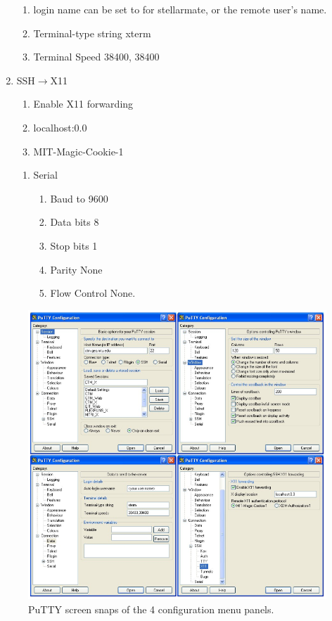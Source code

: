 \begin{enumerate}
\begin{enumerate}
   \item   login name can be set to  for stellarmate, or
     the remote user's name.
   \item   Terminal-type string xterm
   \item   Terminal Speed 38400, 38400
\end{enumerate}
   \item   SSH$\rightarrow$X11
\vspace{-.15cm}
\begin{enumerate}\addtolength{\itemsep}{-0.5\baselineskip}
   \item   Enable X11 forwarding
   \item   localhost:0.0
   \item   MIT-Magic-Cookie-1
\end{enumerate}
\vspace{-.15cm}
\begin{enumerate}\addtolength{\itemsep}{-0.5\baselineskip}
   \item   Serial
\vspace{-.15cm}
\begin{enumerate}\addtolength{\itemsep}{-0.5\baselineskip}
   \item   Baud to 9600
   \item   Data bits 8
   \item   Stop bits 1
   \item   Parity None
   \item   Flow Control None.
\end{enumerate}
\end{enumerate}

\end{enumerate}

\begin{figure}[h!]
\centering
\includegraphics[width=.7\textwidth]{images/PuYYTXming.png}
\caption{PuTTY screen snaps of the 4 configuration menu panels.} %
\label{figure:}
\end{figure}



